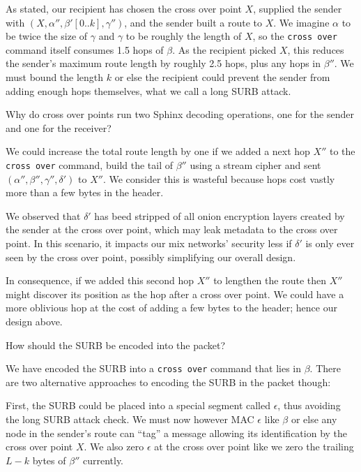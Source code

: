 As stated, our recipient has chosen the cross over point $X$,
supplied the sender with $(X,\alpha'',\beta'[0..k],\gamma'')$,
and the sender built a route to $X$.  We imagine $\alpha$ to be
twice the size of $\gamma$ and $\gamma$ to be roughly the length of
$X$, so the {\tt cross over} command itself consumes 1.5 hops of $\beta$.
As the recipient picked $X$, this reduces the sender's maximum route
length by roughly 2.5 hops, plus any hops in $\beta''$.
We must bound the length $k$ or else the recipient could prevent
the sender from adding enough hops themselves, what we call a
long SURB attack.

\begin{issue}
Why do cross over points run two Sphinx decoding operations,
one for the sender and one for the receiver?
\end{issue}

We could increase the total route length by one if we added a next
hop $X''$ to the {\tt cross over} command, build the tail of $\beta''$
using a stream cipher and sent $(\alpha'',\beta'',\gamma'',\delta')$
to $X''$. We consider this is wasteful because hops cost vastly more
than a few bytes in the header.

We observed that $\delta'$ has beed stripped of all onion encryption
layers created by the sender at the cross over point, which may
leak metadata to the cross over point.
In this scenario, it impacts our mix networks' security less if
$\delta'$ is only ever seen by the cross over point, possibly
simplifying our overall design.

In consequence, if we added this second hop $X''$ to lengthen the
route then $X''$ might discover its position as the hop after a
cross over point.  We could have a more oblivious hop at the cost
of adding a few bytes to the header; hence our design above.

\begin{issue}
How should the SURB be encoded into the packet?
\end{issue}

We have encoded the SURB into a {\tt cross over} command that lies
in $\beta$.  There are two alternative approaches to encoding the
SURB in the packet though: 

First, the SURB could be placed into a special segment called
$\epsilon$, thus avoiding the long SURB attack check.
We must now however MAC $\epsilon$ like $\beta$ or else any
node in the sender's route can ``tag'' a message allowing its
identification by the cross over point $X$.  We also zero
$\epsilon$ at the cross over point like we zero the trailing
$L-k$ bytes of $\beta''$ currently.  

